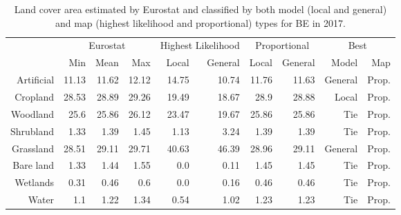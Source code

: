     \begin{table}[H]
    \centering
    \caption{Land cover area estimated by Eurostat and classified by both model (local and general) and map (highest likelihood and proportional) types for BE in 2017.}
    
    \begin{tabular}{r|rrr|rr|rr|rr}
    \toprule
    {} & \multicolumn{3}{|c}{Eurostat} & \multicolumn{2}{|c}{Highest Likelihood} & \multicolumn{2}{|c}{Proportional} & \multicolumn{2}{|c}{Best} \\
    {} &      Min &   Mean &    Max &              Local & General &        Local & General &    Model &    Map \\
    \midrule
    Artificial &    11.13 &  11.62 &  12.12 &              14.75 &   10.74 &        11.76 &   11.63 &  General &  Prop. \\
    Cropland   &    28.53 &  28.89 &  29.26 &              19.49 &   18.67 &         28.9 &   28.88 &    Local &  Prop. \\
    Woodland   &     25.6 &  25.86 &  26.12 &              23.47 &   19.67 &        25.86 &   25.86 &      Tie &  Prop. \\
    Shrubland  &     1.33 &   1.39 &   1.45 &               1.13 &    3.24 &         1.39 &    1.39 &      Tie &  Prop. \\
    Grassland  &    28.51 &  29.11 &  29.71 &              40.63 &   46.39 &        28.96 &   29.11 &  General &  Prop. \\
    Bare land  &     1.33 &   1.44 &   1.55 &                0.0 &    0.11 &         1.45 &    1.45 &      Tie &  Prop. \\
    Wetlands   &     0.31 &   0.46 &    0.6 &                0.0 &    0.16 &         0.46 &    0.46 &      Tie &  Prop. \\
    Water      &      1.1 &   1.22 &   1.34 &               0.54 &    1.02 &         1.23 &    1.23 &      Tie &  Prop. \\
    \bottomrule
    \end{tabular}
    \end{table}
    
